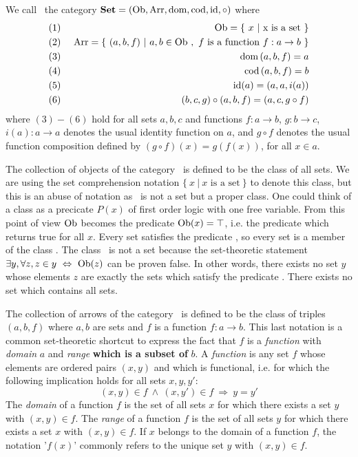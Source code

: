 \begin{defin}\label{Cat:def:set}
    We call \Set\ the category $\mbox{\bf Set}=(\mbox{\rm Ob}, \mbox{\rm Arr}, \mbox{\rm dom}, \mbox{\rm cod}, \mbox{\rm id}, \circ)$ where
    \begin{eqnarray*}
        (1)&\ &\ob = \{\ x\ |\  \mbox{x is a set}\ \}\\
        (2)&\ &\arr = \{\ (a,b,f)\ |\  a,b\in\ob\ ,\ 
        \mbox{$f$ is a function $f : a\to b$}\ \}\\
        (3)&\ &\dom\,(a,b,f) = a\\
        (4)&\ &\cod\,(a,b,f) = b\\
        (5)&\ &\id(a) = (a,a,i(a))\\
        (6)&\ &(b,c,g)\circ(a,b,f) = (a,c,g\circ f)
    \end{eqnarray*}
    where $(3)-(6)$ hold for all sets $a,b,c$ and functions $f:a\to b$,
    $g:b\to c$, $i(a):a\to a$ denotes the usual identity function on $a$,
    and $g\circ f$ denotes the usual function composition defined by 
    $(g\circ f)(x)=g(f(x))$, for all $x\in a$.
\end{defin}
The collection of objects of the category \Set\ is defined to be the 
class of all sets. We are using the set comprehension notation 
$\{\ x\ |\ \mbox{$x$ is a set}\ \}$ to denote this class, but this is an
abuse of notation as \ob\ is not a set but a proper class. One could 
think of a class as a precicate $P(x)$ of first order logic with one
free variable. From this point of view $\mbox{\rm Ob}$ becomes the predicate
$\mbox{\rm Ob}(x)=\top$, i.e. the predicate which returns true for all $x$.
Every set satisfies the predicate \ob, so every set is a member of 
the class \ob. The class \ob\ is not a set because the set-theoretic
statement $\exists y, \forall z, z\in y\ \Leftrightarrow\ \ob(z)$
can be proven false. In other words, there exists no set $y$ whose
elements $z$ are exactly the sets which satisfy the predicate \ob.
There exists no set which contains all sets.

The collection of arrows of the category \Set\ is defined to be the 
class of triples $(a,b,f)$ where $a,b$ are sets and $f$ is a function
$f:a\to b$. This last notation is a common set-theoretic shortcut to
express the fact that $f$ is a {\em function} with {\em domain} $a$ and 
{\em range} {\bf which is a subset of} $b$. A {\em function} is any set $f$
whose elements are ordered pairs $(x,y)$ and which is functional, i.e.
for which the following implication holds for all sets $x,y,y'$:
    \[
        (x,y)\in f\ \land\ (x,y')\in f\ \Rightarrow\ y = y'
    \]
The {\em domain} of a function $f$ is the set of all sets $x$ for which there
exists a set $y$ with $(x,y)\in f$. The {\em range} of a function $f$ is the 
set of all sets $y$ for which there exists a set $x$ with $(x,y)\in f$.
If $x$ belongs to the domain of a function $f$, the notation '$f(x)$' commonly
refers to the unique set $y$ with $(x,y)\in f$. 


